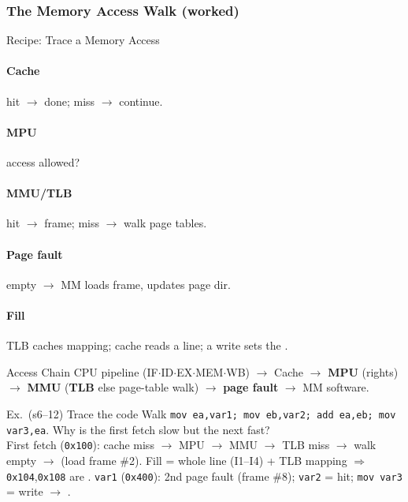 \subsubsection{The Memory Access Walk (worked)}




\begin{KR}{Recipe: Trace a Memory Access}
    \paragraph{Cache} hit $\to$ done; miss $\to$ continue.
    \paragraph{MPU} access allowed?
    \paragraph{MMU/TLB} hit $\to$ frame; miss $\to$ walk page tables.
    \paragraph{Page fault} empty $\to$ MM loads frame, updates page dir.
    \paragraph{Fill} TLB caches mapping; cache reads a line; a write sets the .
\end{KR}

\begin{definition}{Access Chain}
    CPU pipeline (IF$\cdot$ID$\cdot$EX$\cdot$MEM$\cdot$WB) $\to$ Cache $\to$ \textbf{MPU} (rights) $\to$ \textbf{MMU} (\textbf{TLB} else page-table walk) $\to$ \textbf{page fault} $\to$ MM software.
\end{definition}

\begin{example2}{Ex.\ (s6--12) Trace the code}
    Walk \texttt{mov ea,var1; mov eb,var2; add ea,eb; mov var3,ea}. Why is the first fetch slow but the next fast?
     \\ 
    First fetch (\texttt{0x100}): cache miss $\to$ MPU $\to$ MMU $\to$ TLB miss $\to$ walk empty $\to$  (load frame \#2). Fill = whole line (I1--I4) + TLB mapping $\Rightarrow$ \texttt{0x104},\texttt{0x108} are . \texttt{var1} (\texttt{0x400}): 2nd page fault (frame \#8); \texttt{var2} = hit; \texttt{mov var3} = write $\to$ .
\end{example2}


